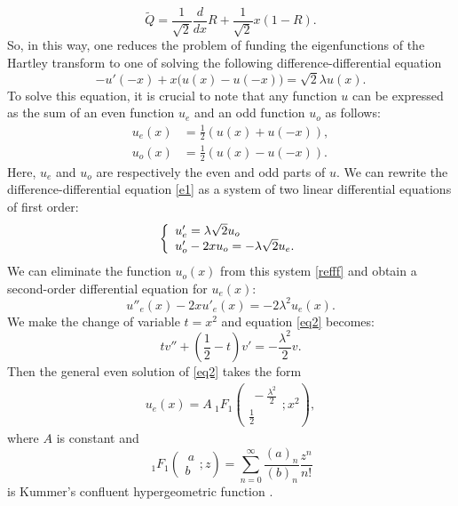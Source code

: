 \documentclass[12 pt]{amsart}
\numberwithin{equation}{section}
\begin{document}
\begin{equation*}
\widetilde{Q}=\frac{1}{\sqrt{2}}\frac{d}{dx}R+\frac{1}{\sqrt{2}}x(1-R).
\end{equation*}
So, in this way, one reduces the problem of funding the eigenfunctions of the Hartley transform to one of solving the following  difference-differential equation
\begin{equation}\label{e1}
-u'(-x)+x\big(u(x)-u(-x)\big)=\sqrt{2}\lambda u(x).
\end{equation}
To solve this equation, it is crucial to note that any function $u$ can be expressed as the sum of an even function $u_e$ and an odd function $u_o$ as follows:\begin{align*}
u_e(x) &= \frac{1}{2} (u(x) + u(-x)), \\
u_o(x) &= \frac{1}{2} (u(x) - u(-x)).
\end{align*}
Here, $u_e$ and $u_o$ are respectively the even and odd parts of $u$.
We can rewrite the difference-differential equation \eqref{e1} as a system of two linear differential equations of first order:
\begin{equation}\label{refff}
\left\{
  \begin{array}{l l}
     u'_e=\lambda \sqrt{2} u_o \\
      u'_o-2xu_o=- \lambda \sqrt{2}u_e.\end{array} \right.
\end{equation}
We can eliminate the function $u_o(x)$ from this system \eqref{refff} and obtain a second-order differential equation for $u_e(x)$:
\begin{equation}\label{eq2}
u''_e(x)-2xu'_e(x)=-2\lambda^2u_e(x).
\end{equation}
We make the change of variable $t=x^2$ and equation \eqref{eq2} becomes:
$$tv''+(\frac{1}{2}-t)v'=-\frac{\lambda^2}{2} v.$$ Then  the general even solution of \eqref{eq2}  takes the form
\begin{align*}
u_e(x)=A \ _{1}F_1\left(\begin{matrix} \
-\frac{\lambda^2}{2}
\\\frac{1}{2}
\end{matrix};x^2\right),
\end{align*}
where  $A$ is  constant   and  $$\ _{1}F_1\left(\begin{matrix} \
a
\\ b
\end{matrix};z\right) = \sum_{n=0}^\infty\frac{(a)_n}{(b)_n}\frac{z^n}{n!}$$ is Kummer's confluent hypergeometric function \cite{AS}.
\end{document}
